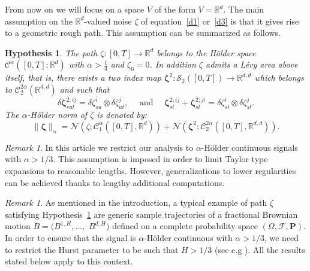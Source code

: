 \documentclass[12pt,reqno]{amsart}
\numberwithin{equation}{section}  %
\newcommand{\der}{\delta}
\newcommand{\1}{{\bf 1}}
\newcommand{\2}{{\bf 2}}
\newcommand{\bzeta}{{\zeta}}
\newcommand{\R}{\mathbb R}
\newcommand{\bp}{\mathbf{P}}
\newcommand{\cac}{\mathcal C}
\newcommand{\cf}{\mathcal F}
\newcommand{\cn}{\mathcal N}
\newcommand{\al}{\alpha}
\newtheorem{hypothesis}[theorem]{Hypothesis}
\theoremstyle{remark}
\newtheorem{remark}[theorem]{Remark}
\theoremstyle{remark}
\newcommand{\beq}{\begin{equation}}
\newcommand{\eeq}{\end{equation}}
\begin{document}
From now on we will focus on a space $V$ of the form $V = \R^d$. The main assumption on the $\R^d$-valued noise $\bzeta$ of equation~\eqref{d1} or~\eqref{d3} is that it gives rise to a geometric rough path. This assumption can be summarized as follows.
\begin{hypothesis}\label{hyp:zeta}
	The path $\zeta:[0,T] \to \R^d$ belongs to the H\"older space ${\cac}^{\al}([0,T];\R^d)$ with $\al > \frac{1}{3}$ and $\zeta_0 = 0$. In addition $\zeta$ admits a L\'evy area above itself, that is, there exists a two index map $\mathbf{\zeta}^2 : {\mathcal{S}_{2}\left([0,T]\right)} \to \R^{d,d}$ which belongs to $\cac_{2}^{2\al}(\R^{d,d})$ and such that 
	\beq\label{eq:zeta^2}
	\der {\mathbf{\zeta}}_{sut}^{2;ij} = {\der \zeta}_{su}^{i} \otimes {\der \zeta}_{ut}^{j},
	\quad\text{  and  }\quad
	{\mathbf{\zeta}_{st}^{2;ij} + \mathbf{\zeta}_{st}^{2;ji}} =  \der \zeta_{st}^{i} \otimes \der \zeta_{st}^{j} .
	\eeq
	The $\al$-H\"older norm of $\zeta$ is denoted by:
	\beq\label{eq:zeta-norm}
	\|\mathbf{\zeta}\|_{\al} = \cn(\zeta;\cac_1^{\al}([0,T],\R^d))
	+\cn(\mathbf{\zeta}^2;\cac_2^{2\al}([0,T],\R^{d,d})).
	\eeq
\end{hypothesis}

\begin{remark}
In this article we restrict our analysis to $\al$-H\"older continuous signals with $\al>1/3$. This assumption is imposed in order to limit Taylor type expansions to reasonable lengths. However, generalizations to lower regularities can be achieved thanks to lengthy additional computations.
\end{remark}

\begin{remark}\label{rmk:fbm}
As mentioned in the introduction, a typical example of path $\zeta$ satisfying Hypothesis~\ref{hyp:zeta} are generic sample trajectories of a fractional Brownian motion $B=(B^{1,H},\ldots,$ $B^{d,H})$ defined on a complete probability space $(\Omega,\cf,\bp)$. In order to ensure that the signal is $\al$-H\"older continuous with $\al>1/3$, we need to restrict the Hurst parameter to be such that $H>1/3$ (see e.g \cite[Chapter 15]{friz-victoir}). All the results stated below apply to this context.
\end{remark}
\end{document}
